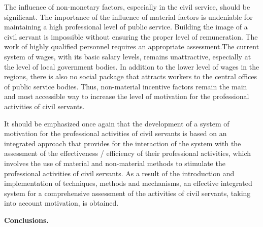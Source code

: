 \begin{multicols}{2}
The influence of non-monetary factors, especially in the civil service,
should be significant. The importance of the influence of material
factors is undeniable for maintaining a high professional level of
public service. Building the image of a civil servant is impossible
without ensuring the proper level of remuneration. The work of highly
qualified personnel requires an appropriate assessment.The current
system of wages, with its basic salary levels, remains unattractive,
especially at the level of local government bodies. In addition to the
lower level of wages in the regions, there is also no social package
that attracts workers to the central offices of public service bodies.
Thus, non-material incentive factors remain the main and most accessible
way to increase the level of motivation for the professional activities
of civil servants.

It should be emphasized once again that the development of a system of
motivation for the professional activities of civil servants is based on
an integrated approach that provides for the interaction of the system
with the assessment of the effectiveness / efficiency of their
professional activities, which involves the use of material and
non-material methods to stimulate the professional activities of civil
servants. As a result of the introduction and implementation of
techniques, methods and mechanisms, an effective integrated system for a
comprehensive assessment of the activities of civil servants, taking
into account motivation, is obtained.
\end{multicols}

{\bfseries Conclusions.}

